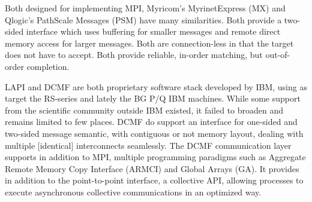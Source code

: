 Both designed for implementing MPI, Myricom's MyrinetExpress (MX) and Qlogic's PathScale
Messages (PSM) have many similarities. Both provide a two-sided interface which uses
buffering for smaller messages and remote direct memory access for larger messages.  Both
are connection-less in that the target does not have to accept.  Both provide reliable,
in-order matching, but out-of-order completion.

LAPI\cite{lapi_a_1998} and DCMF\cite{Kumar:2008:DCM:1375527.1375544}
are both proprietary software stack developed by IBM, using as target
the RS-series and lately the BG P/Q IBM machines. While some support
from the scientific community outside IBM existed, it failed to
broaden and remains limited to few places. DCMF do support an
interface for one-sided and two-sided message semantic, with
contiguous or not memory layout, dealing with multiple [identical]
interconnects seamlessly. The DCMF communication layer supports in
addition to MPI, multiple programming paradigms such as Aggregate
Remote Memory Copy Interface (ARMCI) and Global Arrays (GA). It
provides in addition to the point-to-point interface, a collective
API, allowing processes to execute asynchronous collective
communications in an optimized way.
